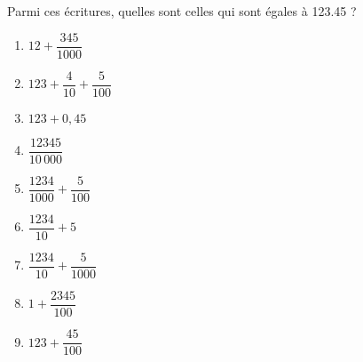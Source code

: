 \begin{exercice}
    Parmi ces écritures, quelles sont celles qui sont égales à \num{123.45} ? \smallskip
    \begin{multicols}{2}
      \begin{enumerate}
         \item $12+\dfrac{345}{\num{1 000}}$ \smallskip
         \item \small$123+\dfrac{4}{10}+\dfrac{5}{100}$ \smallskip
         \item $123+0,45$ \smallskip
         \item $\dfrac{\num{12 345}}{10\,000}$ \smallskip
         \item $\dfrac{\num{1 234}}{\num{1 000}}+\dfrac{5}{100}$ \smallskip 
         \item $\dfrac{\num{1 234}}{10}+5$ \smallskip
         \item $\dfrac{\num{1 234}}{10}+\dfrac{5}{\num{1 000}}$ \smallskip
         \item $1+\dfrac{\num{2 345}}{100}$ \smallskip
         \item $123+\dfrac{45}{100}$
      \end{enumerate}
   \end{multicols}
 \end{exercice}